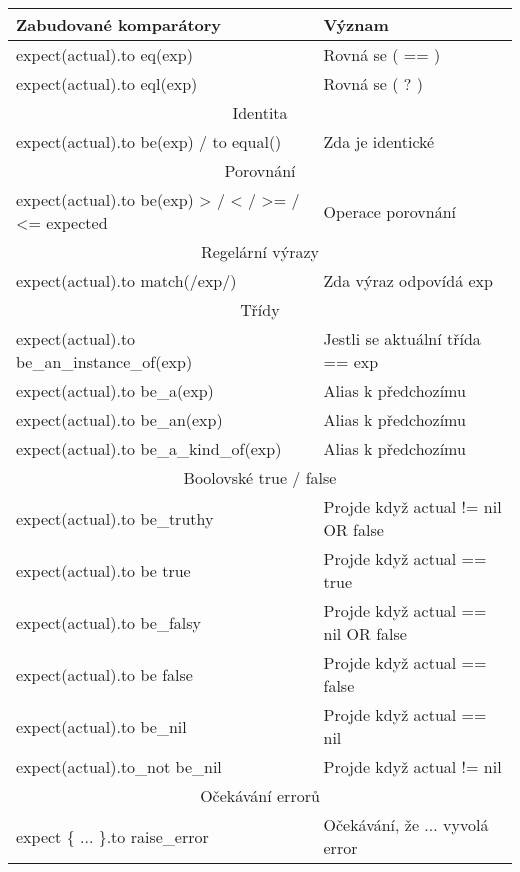 \begin{center}
\begin{longtable}{| p{} | p{} |} 
\hline
 \textbf{Zabudované komparátory} & \textbf{Význam} \\ 
 \hline\hline
 expect(actual).to eq(exp) & Rovná se ( == ) \\
 \hline
 expect(actual).to eql(exp) & Rovná se ( ? ) \\
 \hline\hline
 \multicolumn{2}{||c||}{Identita}\\
 \hline
 expect(actual).to be(exp) / to equal() & Zda je identické\\
 \hline\hline
 \multicolumn{2}{||c||}{Porovnání}\\
 \hline
 expect(actual).to be(exp) > / < / >= / <= expected & Operace porovnání \\
 \hline\hline
 \multicolumn{2}{||c||}{Regelární výrazy}\\
 \hline
 expect(actual).to match(/exp/) & Zda výraz odpovídá exp \\
 \hline\hline
 \multicolumn{2}{||c||}{Třídy}\\
 \hline\hline
 expect(actual).to be\_an\_instance\_of(exp) & Jestli se aktuální třída == exp \\
 \hline
 expect(actual).to be\_a(exp) & Alias k předchozímu \\
 \hline
 expect(actual).to be\_an(exp) & Alias k předchozímu  \\
 \hline
 expect(actual).to be\_a\_kind\_of(exp) & Alias k předchozímu  \\
 \hline
 \multicolumn{2}{||c||}{Boolovské true / false}\\
 \hline\hline
 expect(actual).to be\_truthy  & Projde když actual != nil OR false\\
 \hline
 expect(actual).to be true    & Projde když actual == true \\
 \hline
 expect(actual).to be\_falsy   & Projde když actual == nil OR false \\
 \hline
 expect(actual).to be false   & Projde když actual == false \\
 \hline
 expect(actual).to be\_nil     & Projde když actual == nil \\
 \hline
 expect(actual).to\_not be\_nil & Projde když actual != nil \\
 \hline
 \multicolumn{2}{||c||}{Očekávání errorů}\\
 \hline\hline
 expect \{ ... \}.to raise\_error & Očekávání, že ... vyvolá error \\

\end{longtable}
\end{center}
